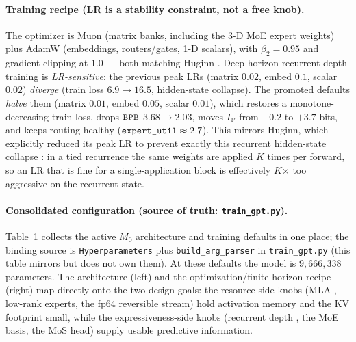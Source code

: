\documentclass[11pt]{article}
\newcommand{\bpb}{\textsc{bpb}}
\newcommand{\code}[1]{\texttt{#1}}
\begin{document}
\paragraph{Training recipe (LR is a stability constraint, not a free knob).}
The optimizer is Muon (matrix banks, including the 3-D MoE expert weights) plus AdamW (embeddings,
routers/gates, 1-D scalars), with \(\beta_2{=}0.95\) and gradient clipping at \(1.0\) --- both matching
Huginn \cite{huginn}.  Deep-horizon recurrent-depth training is \emph{LR-sensitive}: the previous peak
LRs (matrix \(0.02\), embed \(0.1\), scalar \(0.02\)) \emph{diverge} (train loss \(6.9{\to}16.5\),
hidden-state collapse).  The promoted defaults \emph{halve} them (matrix \(0.01\), embed \(0.05\),
scalar \(0.01\)), which restores a monotone-decreasing train loss, drops \(\bpb\) \(3.68{\to}2.03\),
moves \(I_{\mathcal V}\) from \(-0.2\) to \(+3.7\) bits, and keeps routing healthy
(\(\code{\detokenize{expert_util}}\approx2.7\)).  This mirrors Huginn, which explicitly reduced its peak
LR to prevent exactly this recurrent hidden-state collapse \cite{huginn}: in a tied recurrence the same
weights are applied \(K\) times per forward, so an LR that is fine for a single-application block is
effectively \(K\)\(\times\) too aggressive on the recurrent state.

\paragraph{Consolidated configuration (source of truth: \code{train\_gpt.py}).}
Table~1 collects the active \(M_0\) architecture and training defaults in one place;
the binding source is \code{Hyperparameters} plus \code{build\_arg\_parser} in \code{train\_gpt.py}
(this table mirrors but does not own them).  At these defaults the model is \(9{,}666{,}338\)
parameters.  The architecture (left) and the optimization/finite-horizon recipe (right) map directly
onto the two design goals: the resource-side knobs (MLA \code{}, low-rank
experts, the fp64 reversible stream) hold activation memory and the KV footprint small, while the
expressiveness-side knobs (recurrent depth \code{}, the MoE basis, the MoS head)
supply usable predictive information.
\end{document}
